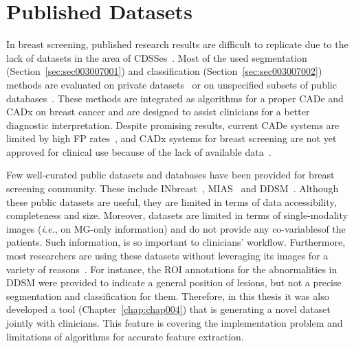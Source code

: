 \section{Published Datasets}
\label{sec:sec003008}

In breast screening, published research results are difficult to replicate due to the lack of datasets in the area of \acp{CDSSe}~\cite{lee2017curated}.
Most of the used segmentation (Section~\ref{sec:sec003007001}) and classification (Section~\ref{sec:sec003007002}) methods are evaluated on private datasets~\cite{SADAF2011457} or on unspecified subsets of public databases~\cite{https://doi.org/10.1118/1.4921612}.
These methods are integrated as algorithms for a proper \ac{CADe} and \ac{CADx} on breast cancer and are designed to assist clinicians for a better diagnostic interpretation.
Despite promising results, current \ac{CADe} systems are limited by high \ac{FP} rates~\cite{NISHIKAWA20141320}, and \ac{CADx} systems for breast screening are not yet approved for clinical use because of the lack of available data~\cite{10.1145/3079765}.

Few well-curated public datasets and databases have been provided for breast screening community.
These include INbreast~\cite{MOREIRA2012236}, \ac{MIAS}~\cite{7813261} and \ac{DDSM}~\cite{shen2019deep}.
Although these public datasets are useful, they are limited in terms of data accessibility, completeness and size.
Moreover, datasets are limited in terms of single-modality images ({\it i.e.}, on \ac{MG}-only information) and do not provide any co-variables\footnotemark[10] of the patients.
Such information, is so important to clinicians' workflow.
Furthermore, most researchers are using these datasets without leveraging its images for a variety of reasons~\cite{lee2017curated}.
For instance, the \ac{ROI} annotations for the abnormalities in \ac{DDSM} were provided to indicate a general position of lesions, but not a precise segmentation and classification for them.
Therefore, in this thesis it was also developed a tool (Chapter~\ref{chap:chap004}) that is generating a novel dataset jointly with clinicians.
This feature is covering the implementation problem and limitations of algorithms for accurate feature extraction.

